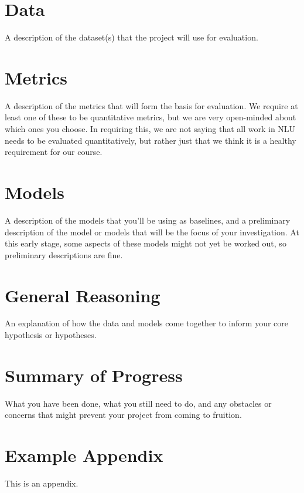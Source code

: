\documentclass[11pt]{article}
\begin{document}
    \section{Data}

    A description of the dataset(s) that the project will use for evaluation.


    \section{Metrics}

    A description of the metrics that will form the basis for evaluation.
    We require at least one of these to be quantitative metrics, but we are very open-minded about which ones you choose.
    In requiring this, we are not saying that all work in NLU needs to be evaluated quantitatively, but rather just that we think it is a healthy requirement for our course.


    \section{Models}

    A description of the models that you'll be using as baselines, and a preliminary description of the model or models that will be the focus of your investigation.
    At this early stage, some aspects of these models might not yet be worked out, so preliminary descriptions are fine.


    \section{General Reasoning}

    An explanation of how the data and models come together to inform your core hypothesis or hypotheses.


    \section{Summary of Progress}

    What you have been done, what you still need to do, and any obstacles or concerns that might prevent your project
    from coming to fruition.

    

    \appendix


    \section{Example Appendix}\label{sec:appendix}

    This is an appendix.
\end{document}

